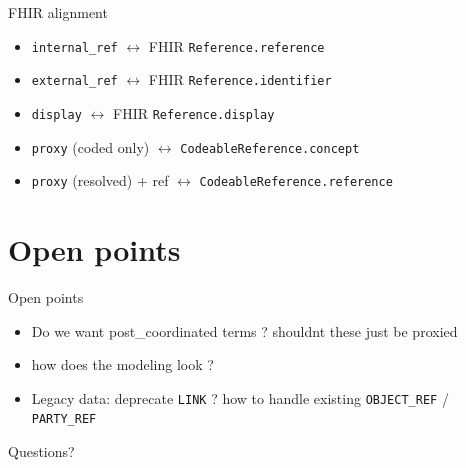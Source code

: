 \documentclass[10pt]{beamer}
\begin{document}
\begin{frame}{FHIR alignment}
  \begin{itemize}
    \item \texttt{internal\_ref} $\leftrightarrow$ FHIR \texttt{Reference.reference}
    \item \texttt{external\_ref} $\leftrightarrow$ FHIR \texttt{Reference.identifier}
    \item \texttt{display} $\leftrightarrow$ FHIR \texttt{Reference.display}
    \item \texttt{proxy} (coded only) $\leftrightarrow$ \texttt{CodeableReference.concept}
    \item \texttt{proxy} (resolved) + ref $\leftrightarrow$ \texttt{CodeableReference.reference}
  \end{itemize}
\end{frame}

\section{Open points}

\begin{frame}{Open points}
  \begin{itemize}
    \item Do we want post\_coordinated terms ? shouldnt these just be proxied
    \item how does the modeling look ?
    \item Legacy data: deprecate \texttt{LINK} ? how to handle existing \texttt{OBJECT\_REF} / \texttt{PARTY\_REF}
  \end{itemize}
\end{frame}

\begin{frame}[standout]
  Questions?
\end{frame}
\end{document}
